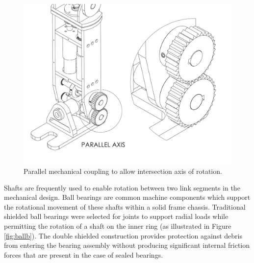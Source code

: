 \begin{figure}[!h]	
	\begin{center}
    \includegraphics[scale=0.5]{fig/design/parallel.pdf}
	\end{center}
  \caption{Parallel mechanical coupling to allow intersection axis of rotation.}
\label{fig:spur}
\end{figure}

Shafts are frequently used to enable rotation between two link segments in the mechanical design. Ball bearings are common machine components which support the rotational movement of these shafts within a solid frame chassis. Traditional shielded ball bearings were selected for joints to support radial loads while permitting the rotation of a shaft on the inner ring (as illustrated in Figure \ref{fig:ballb}). The double shielded construction provides protection against debris from entering the bearing assembly without producing significant internal friction forces that are present in the case of sealed bearings. 

